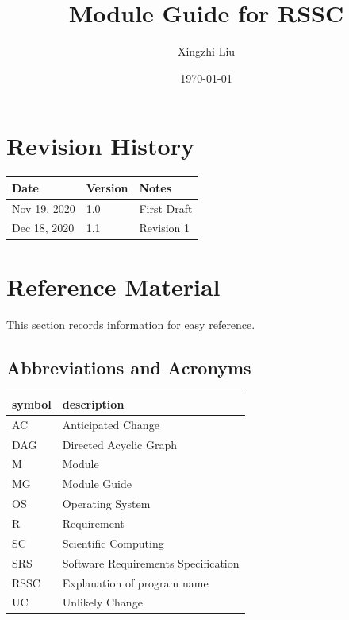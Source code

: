 \documentclass[12pt, titlepage]{article}
\begin{document}
\title{Module Guide for RSSC} 
\author{Xingzhi Liu}
\date{\today}

\maketitle


\section{Revision History}

\begin{tabularx}{\textwidth}{p{3cm}p{2cm}X}
\toprule {\bf Date} & {\bf Version} & {\bf Notes}\\
\midrule
Nov 19, 2020 & 1.0 & First Draft\\
Dec 18, 2020 & 1.1 & Revision 1\\
\bottomrule
\end{tabularx}

\newpage

\section{Reference Material}

This section records information for easy reference.

\subsection{Abbreviations and Acronyms}

\renewcommand{\arraystretch}{1.2}
\begin{tabular}{l l} 
  \toprule		
  \textbf{symbol} & \textbf{description}\\
  \midrule 
  AC & Anticipated Change\\
  DAG & Directed Acyclic Graph \\
  M & Module \\
  MG & Module Guide \\
  OS & Operating System \\
  R & Requirement\\
  SC & Scientific Computing \\
  SRS & Software Requirements Specification\\
  RSSC & Explanation of program name\\
  UC & Unlikely Change \\
  \bottomrule
\end{tabular}\\
\end{document}

